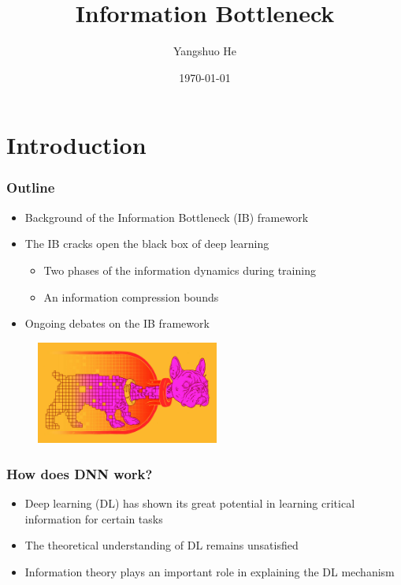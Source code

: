 \documentclass[notes]{beamer}
\title %
{Information Bottleneck}
\subtitle{}
\author[Yangshuo He] %
{Yangshuo He}
\institute[UoM] %
{
    The University of Melbourne
    \and
    Department of Electrical and Electronic Engineering
}
\date{\today}
\begin{document}
\frame{\titlepage}

\section{Introduction}

\begin{frame}
\frametitle{Outline}
\begin{itemize}
    \item Background of the Information Bottleneck (IB) framework
    \item The IB cracks open the black box of deep learning
    \begin{itemize}
        \item Two phases of the information dynamics during training
        \item An information compression bounds
    \end{itemize}
    \item Ongoing debates on the IB framework
\end{itemize}
\begin{figure}
    \centering
    \includegraphics[width=6cm]{IB_dog.jpg}
\end{figure}
\end{frame}





\begin{frame}
    \frametitle{How does DNN work?}
    \begin{itemize}
        \item Deep learning (DL) has shown its great potential in learning critical information for certain tasks 
        \item The theoretical understanding of DL remains unsatisfied 
        \item Information theory plays an important role in explaining the DL mechanism 
    \end{itemize}
\end{frame}
\end{document}
